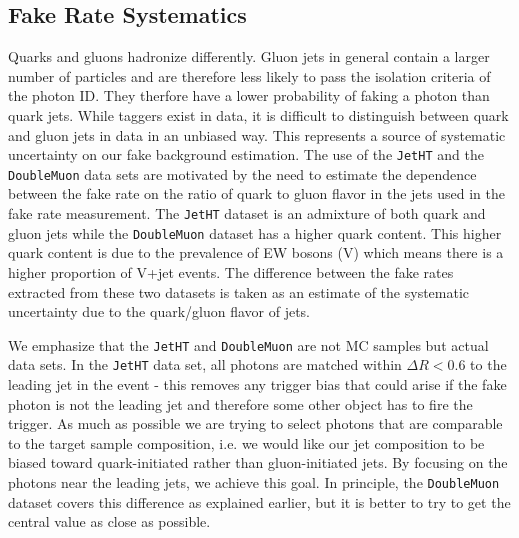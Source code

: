 \subsection{Fake Rate Systematics}

Quarks and gluons hadronize differently. Gluon jets in general contain a larger number of particles and are therefore less likely to pass the isolation criteria of the photon ID. They therfore have a lower probability of faking a photon than quark jets. While taggers exist in data, it is difficult to distinguish between quark and gluon jets in data in an unbiased way. This represents a source of systematic uncertainty on our fake background estimation. The use of the \texttt{JetHT} and the \texttt{DoubleMuon} data sets are motivated by the need to  estimate the dependence between the fake rate on the ratio of quark to gluon flavor in the jets used in the fake rate measurement. The \texttt{JetHT} dataset is an admixture of both quark and gluon jets while the \texttt{DoubleMuon} dataset has a higher quark content. This higher quark content is due to the prevalence of EW bosons (V) which means there is a higher proportion of V+jet events. The difference between the fake rates extracted from these two datasets is taken as an estimate of the systematic uncertainty due to the quark/gluon flavor of jets. 

We emphasize that the \texttt{JetHT} and \texttt{DoubleMuon} are not MC samples but actual data sets. In the \texttt{JetHT} data set, all photons are matched within $\Delta R<0.6$ to the leading jet in the event - this removes any trigger bias that could arise if the fake photon is not the leading jet and therefore some other object has to fire the trigger. As much as possible we are trying to select photons that are comparable to the target sample composition, i.e. we would like our jet composition to be biased toward quark-initiated rather than gluon-initiated jets. By focusing on the photons near the leading jets, we achieve this goal. In principle, the \texttt{DoubleMuon} dataset covers this difference as explained earlier, but it is better to try to get the central value as close as possible. 

